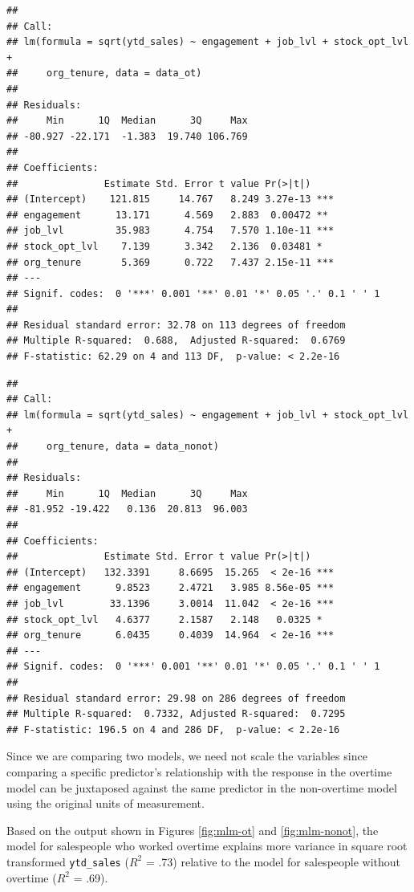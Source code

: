 \documentclass[
]{book}
\begin{document}
\begin{verbatim}
## 
## Call:
## lm(formula = sqrt(ytd_sales) ~ engagement + job_lvl + stock_opt_lvl + 
##     org_tenure, data = data_ot)
## 
## Residuals:
##     Min      1Q  Median      3Q     Max 
## -80.927 -22.171  -1.383  19.740 106.769 
## 
## Coefficients:
##               Estimate Std. Error t value Pr(>|t|)    
## (Intercept)    121.815     14.767   8.249 3.27e-13 ***
## engagement      13.171      4.569   2.883  0.00472 ** 
## job_lvl         35.983      4.754   7.570 1.10e-11 ***
## stock_opt_lvl    7.139      3.342   2.136  0.03481 *  
## org_tenure       5.369      0.722   7.437 2.15e-11 ***
## ---
## Signif. codes:  0 '***' 0.001 '**' 0.01 '*' 0.05 '.' 0.1 ' ' 1
## 
## Residual standard error: 32.78 on 113 degrees of freedom
## Multiple R-squared:  0.688,  Adjusted R-squared:  0.6769 
## F-statistic: 62.29 on 4 and 113 DF,  p-value: < 2.2e-16
\end{verbatim}

\begin{verbatim}
## 
## Call:
## lm(formula = sqrt(ytd_sales) ~ engagement + job_lvl + stock_opt_lvl + 
##     org_tenure, data = data_nonot)
## 
## Residuals:
##     Min      1Q  Median      3Q     Max 
## -81.952 -19.422   0.136  20.813  96.003 
## 
## Coefficients:
##               Estimate Std. Error t value Pr(>|t|)    
## (Intercept)   132.3391     8.6695  15.265  < 2e-16 ***
## engagement      9.8523     2.4721   3.985 8.56e-05 ***
## job_lvl        33.1396     3.0014  11.042  < 2e-16 ***
## stock_opt_lvl   4.6377     2.1587   2.148   0.0325 *  
## org_tenure      6.0435     0.4039  14.964  < 2e-16 ***
## ---
## Signif. codes:  0 '***' 0.001 '**' 0.01 '*' 0.05 '.' 0.1 ' ' 1
## 
## Residual standard error: 29.98 on 286 degrees of freedom
## Multiple R-squared:  0.7332, Adjusted R-squared:  0.7295 
## F-statistic: 196.5 on 4 and 286 DF,  p-value: < 2.2e-16
\end{verbatim}

Since we are comparing two models, we need not scale the variables since comparing a specific predictor's relationship with the response in the overtime model can be juxtaposed against the same predictor in the non-overtime model using the original units of measurement.

Based on the output shown in Figures \ref{fig:mlm-ot} and \ref{fig:mlm-nonot}, the model for salespeople who worked overtime explains more variance in square root transformed \texttt{ytd\_sales} (\(R^2\) = .73) relative to the model for salespeople without overtime (\(R^2\) = .69).
\end{document}
